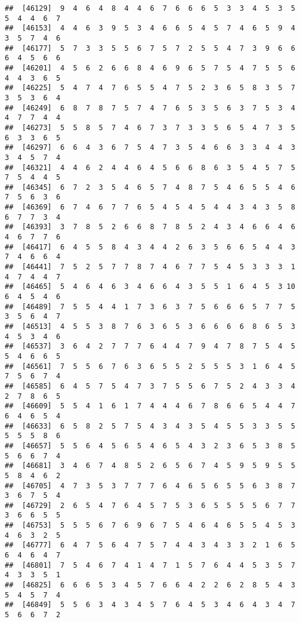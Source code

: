 \documentclass[
]{book}
\begin{document}
\begin{verbatim}
##  [46129]  9  4  6  4  8  4  4  6  7  6  6  6  5  3  3  4  5  3  5  5  4  4  6  7
##  [46153]  4  4  6  3  9  5  3  4  6  6  5  4  5  7  4  6  5  9  4  3  5  7  4  6
##  [46177]  5  7  3  3  5  5  6  7  5  7  2  5  5  4  7  3  9  6  6  6  4  5  6  6
##  [46201]  4  5  6  2  6  6  8  4  6  9  6  5  7  5  4  7  5  5  6  4  4  3  6  5
##  [46225]  5  4  7  4  7  6  5  5  4  7  5  2  3  6  5  8  3  5  7  3  5  3  6  4
##  [46249]  6  8  7  8  7  5  7  4  7  6  5  3  5  6  3  7  5  3  4  4  7  7  4  4
##  [46273]  5  5  8  5  7  4  6  7  3  7  3  3  5  6  5  4  7  3  5  6  3  3  6  5
##  [46297]  6  6  4  3  6  7  5  4  7  3  5  4  6  6  3  3  4  4  3  3  4  5  7  4
##  [46321]  4  4  6  2  4  4  6  4  5  6  6  8  6  3  5  4  5  7  5  7  5  4  4  5
##  [46345]  6  7  2  3  5  4  6  5  7  4  8  7  5  4  6  5  5  4  6  7  5  6  3  6
##  [46369]  6  7  4  6  7  7  6  5  4  5  4  5  4  4  3  4  3  5  8  6  7  7  3  4
##  [46393]  3  7  8  5  2  6  6  8  7  8  5  2  4  3  4  6  6  4  6  4  6  7  7  6
##  [46417]  6  4  5  5  8  4  3  4  4  2  6  3  5  6  6  5  4  4  3  7  4  6  6  4
##  [46441]  7  5  2  5  7  7  8  7  4  6  7  7  5  4  5  3  3  3  1  4  7  4  4  7
##  [46465]  5  4  6  4  6  3  4  6  6  4  3  5  5  1  6  4  5  3 10  6  4  5  4  6
##  [46489]  7  5  5  4  4  1  7  3  6  3  7  5  6  6  6  5  7  7  5  3  5  6  4  7
##  [46513]  4  5  5  3  8  7  6  3  6  5  3  6  6  6  6  8  6  5  3  4  5  3  4  6
##  [46537]  3  6  4  2  7  7  7  6  4  4  7  9  4  7  8  7  5  4  5  5  4  6  6  5
##  [46561]  7  5  5  6  7  6  3  6  5  5  2  5  5  5  3  1  6  4  5  7  5  6  7  4
##  [46585]  6  4  5  7  5  4  7  3  7  5  5  6  7  5  2  4  3  3  4  2  7  8  6  5
##  [46609]  5  5  4  1  6  1  7  4  4  4  6  7  8  6  6  5  4  4  7  6  4  6  5  4
##  [46633]  6  5  8  2  5  7  5  4  3  4  3  5  4  5  5  3  3  5  5  5  5  5  8  6
##  [46657]  5  5  6  4  5  6  5  4  6  5  4  3  2  3  6  5  3  8  5  5  6  6  7  4
##  [46681]  3  4  6  7  4  8  5  2  6  5  6  7  4  5  9  5  9  5  5  5  8  4  6  2
##  [46705]  4  7  3  5  3  7  7  7  6  4  6  5  6  5  5  6  3  8  7  3  6  7  5  4
##  [46729]  2  6  5  4  7  6  4  5  7  5  3  6  5  5  5  5  6  7  7  3  6  6  5  5
##  [46753]  5  5  5  6  7  6  9  6  7  5  4  6  4  6  5  5  4  5  3  4  6  3  2  5
##  [46777]  6  4  7  5  6  4  7  5  7  4  4  3  4  3  3  2  1  6  5  6  4  6  4  7
##  [46801]  7  5  4  6  7  4  1  4  7  1  5  7  6  4  4  5  3  5  7  4  3  3  5  1
##  [46825]  6  6  6  5  3  4  5  7  6  6  4  2  2  6  2  8  5  4  3  5  4  5  7  4
##  [46849]  5  5  6  3  4  3  4  5  7  6  4  5  3  4  6  4  3  4  7  5  6  6  7  2

\end{verbatim}
\end{document}
